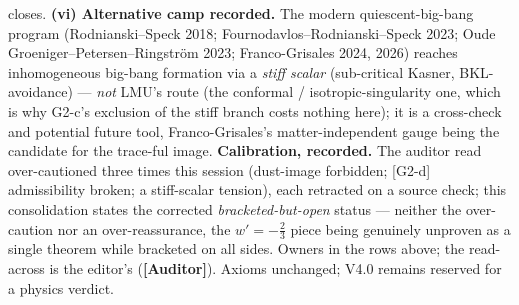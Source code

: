 \documentclass[11pt]{article}
\newcommand{\Auditor}{\textbf{\textcolor{teal!55!black}{[Auditor]}}}
\begin{document}
{closes. \textbf{(vi) Alternative camp recorded.} The modern quiescent-big-bang program (Rodnianski--Speck 2018; Fournodavlos--Rodnianski--Speck 2023; Oude Groeniger--Petersen--Ringstr\"om 2023; Franco-Grisales 2024, 2026) reaches inhomogeneous big-bang formation via a \emph{stiff scalar} (sub-critical Kasner, BKL-avoidance) --- \emph{not} LMU's route (the conformal / isotropic-singularity one, which is why G2-c's exclusion of the stiff branch costs nothing here); it is a cross-check and potential future tool, Franco-Grisales's matter-independent gauge being the candidate for the trace-ful image. \textbf{Calibration, recorded.} The auditor read over-cautioned three times this session (dust-image forbidden; [G2-d] admissibility broken; a stiff-scalar tension), each retracted on a source check; this consolidation states the corrected \emph{bracketed-but-open} status --- neither the over-caution nor an over-reassurance, the $w'=-\tfrac23$ piece being genuinely unproven as a single theorem while bracketed on all sides. Owners in the rows above; the read-across is the editor's (\Auditor). Axioms unchanged; V4.0 remains reserved for a physics verdict.

}
\end{document}
